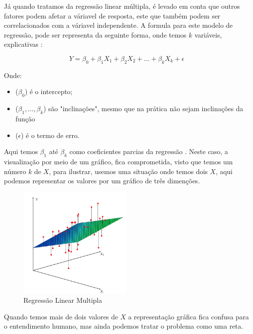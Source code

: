 \documentclass[
	12pt,				%
	openright,			%
	oneside,			%
	a4paper,			%
	english,			%
	brazil				%
	]{abntex2}
\begin{document}
Já quando tratamos da regressão linear múltipla, é levado em conta que outros fatores podem afetar a
váriavel de resposta, este que também podem ser correlacionados com a váriavel independente. A formula
para este modelo de regressão, pode ser representa da seguinte forma, onde temos $k$ variáveis, 
explicativas \cite{modelos_regressao_linear}:

\begin{equation}
	\label{rq_reg_multipla}
	Y = \beta_0 + \beta_1X_1 + \beta_2X_2 + ... + \beta_kX_k + \epsilon
\end{equation}

Onde:
\begin{itemize}
	\item ($\beta_0$) é o intercepto;
	\item ($\beta_1,...,\beta_k$) são "inclinações", mesmo que na prática não sejam inclinações da função
	\item ($\epsilon$) é o termo de erro.
\end{itemize}

Aqui temos $\beta_1$ até $\beta_k$ como coeficientes parcias da regressão \cite{modelos_regressao_linear}. Neste caso, a visualização por
meio de um gráfico, fica comprometida, visto que temos um número $k$ de $X$, para ilustrar, usemos uma
situação onde temos dois $X$, aqui podemos representar os valores por um gráfico de três dimenções.

\begin{figure}[htb]
    \centering
    \caption{\label{Regressão Linear Multipla}Regressão Linear Multipla}
    \includegraphics[width=0.50\textwidth]{../Imgs/reg_linear_multipla.png}
\end{figure}

Quando temos mais de dois valores de $X$ a representação gráfica fica confusa para o entendimento humano,
mas ainda podemos tratar o problema como uma reta.
\end{document}
